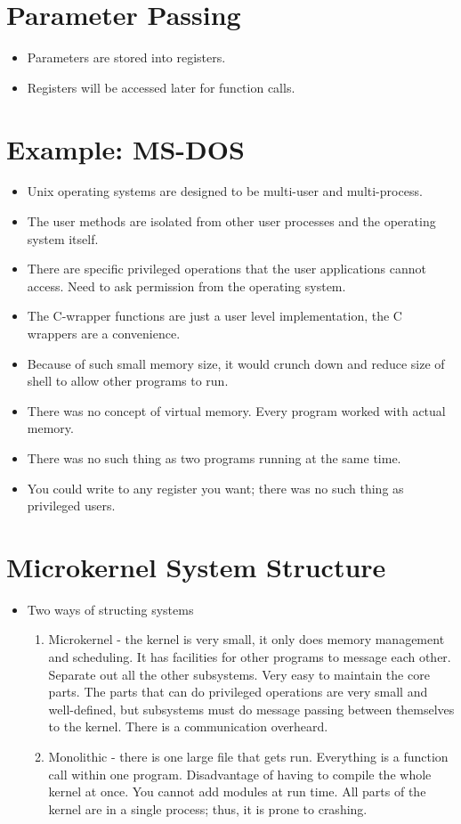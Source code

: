 \documentclass[]{article}
\begin{document}
\section{Parameter Passing}
\begin{itemize}
\item Parameters are stored into registers.
\item Registers will be accessed later for function calls.
\end{itemize}

\section{Example: MS-DOS}
\begin{itemize}
\item Unix operating systems are designed to be multi-user and multi-process.
\item The user methods are isolated from other user processes and the operating
system itself.
\item There are specific privileged operations that the user applications cannot
access. Need to ask permission from the operating system.
\item The C-wrapper functions are just a user level implementation, the C
wrappers are a convenience.
\item Because of such small memory size, it would crunch down and reduce size of
shell to allow other programs to run.
\item There was no concept of virtual memory. Every program worked with actual
memory.
\item There was no such thing as two programs running at the same time.
\item You could write to any register you want; there was no such thing as
privileged users.
\end{itemize}

\section{Microkernel System Structure}
\begin{itemize}
\item Two ways of structing systems
\begin{enumerate}
\item Microkernel - the kernel is very small, it only does memory management and
scheduling. It has facilities for other programs to message each other. Separate
out all the other subsystems. Very easy to maintain the core parts. The parts
that can do privileged operations are very small and well-defined, but
subsystems must do message passing between themselves to the kernel. There is a
communication overheard.
\item Monolithic - there is one large file that gets run. Everything is a
function call within one program. Disadvantage of having to compile the whole
kernel at once. You cannot add modules at run time. All parts of the kernel are
in a single process; thus, it is prone to crashing.
\end{enumerate}
\end{itemize}
\end{document}
